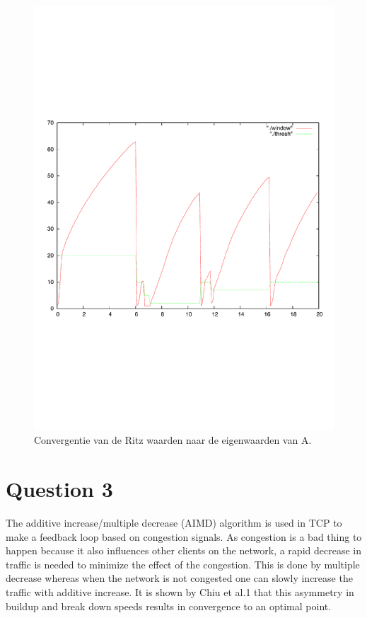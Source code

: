 \documentclass[a4paper]{report}
\newcommand{\opgave}[1]{\section{Question #1}}
\begin{document}
\begin{figure}[htb]
\centerline{\includegraphics{Exercise2/Question2_2.pdf}}
\caption{Convergentie van de Ritz waarden naar de eigenwaarden van A.}
\label{fig:figure6}
\end{figure}

\opgave{3}
The additive increase/multiple decrease (AIMD) algorithm is used in TCP to make a feedback loop based on congestion signals. As congestion is a bad thing to happen because it also influences other clients on the network, a rapid decrease in traffic is needed to minimize the effect of the congestion. This is done by multiple decrease whereas when the network is not congested one can slowly increase the traffic with additive increase. It is shown by Chiu et al.1 that this asymmetry in buildup and break down speeds results in convergence to an optimal point.
\end{document}
